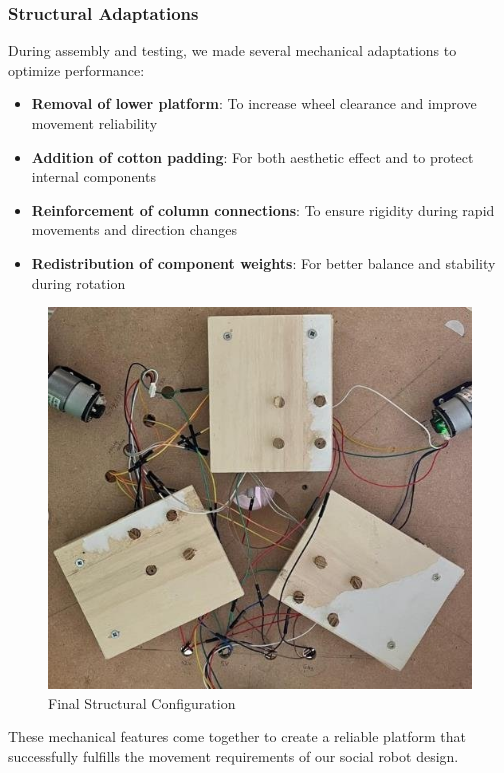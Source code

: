 \subsubsection{Structural Adaptations}

During assembly and testing, we made several mechanical adaptations to optimize performance:

\begin{itemize}
    \item \textbf{Removal of lower platform}: To increase wheel clearance and improve movement reliability
    
    \item \textbf{Addition of cotton padding}: For both aesthetic effect and to protect internal components
    
    \item \textbf{Reinforcement of column connections}: To ensure rigidity during rapid movements and direction changes
    
    \item \textbf{Redistribution of component weights}: For better balance and stability during rotation
\end{itemize}

\begin{figure}[H]
    \centering
    \includegraphics[width=0.7\linewidth]{../ReportMovementModule/images/Aspose.Words.728084da-df58-4b9d-a372-f65cffbdb23d.025.jpeg}
    \caption{Final Structural Configuration}
\end{figure}

These mechanical features come together to create a reliable platform that successfully fulfills the movement requirements of our social robot design.
